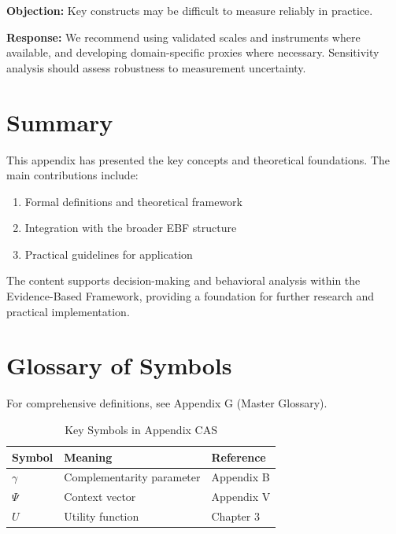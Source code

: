 \textbf{Objection:} Key constructs may be difficult to measure reliably in
practice.

\textbf{Response:} We recommend using validated scales and instruments where
available, and developing domain-specific proxies where necessary. Sensitivity
analysis should assess robustness to measurement uncertainty.



\section{Summary}
\label{sec:cas-summary}

This appendix has presented the key concepts and theoretical foundations.
The main contributions include:

\begin{enumerate}
    \item Formal definitions and theoretical framework
    \item Integration with the broader EBF structure
    \item Practical guidelines for application
\end{enumerate}

The content supports decision-making and behavioral analysis within the
Evidence-Based Framework, providing a foundation for further research
and practical implementation.


\section{Glossary of Symbols}
\label{sec:cas-glossary}

For comprehensive definitions, see Appendix G (Master Glossary).

\begin{table}[htbp]
\centering
\caption{Key Symbols in Appendix CAS}
\begin{tabular}{lll}
\toprule
\textbf{Symbol} & \textbf{Meaning} & \textbf{Reference} \\
\midrule
$\gamma$ & Complementarity parameter & Appendix B \\
$\Psi$ & Context vector & Appendix V \\
$U$ & Utility function & Chapter 3 \\
\bottomrule
\end{tabular}
\end{table}


